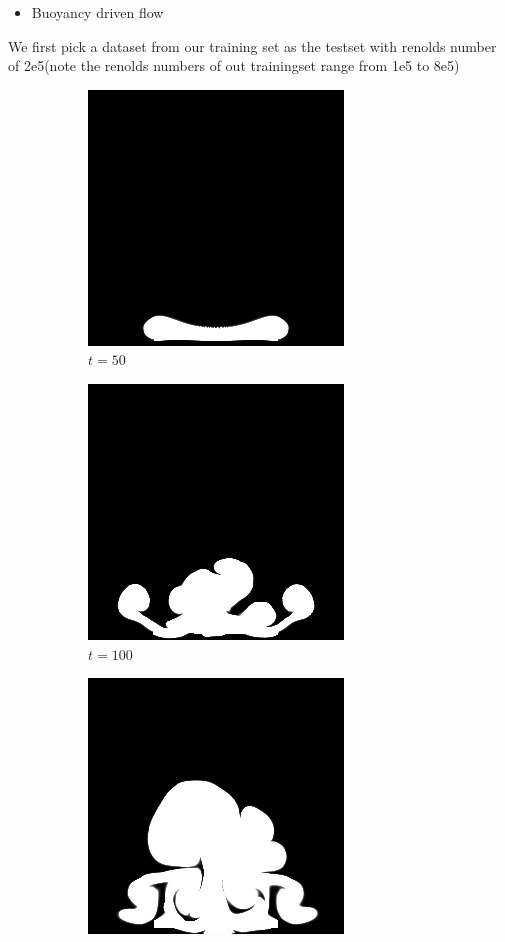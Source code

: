 \documentclass[a4paper,12pt,twoside]{report}
\begin{document}
\begin{itemize}
  \item Buoyancy driven flow
\end{itemize}
We first pick a dataset from our training set as the testset with renolds number of 2e5(note the renolds numbers of out trainingset range from 1e5 to 8e5)
\begin{figure}
\centering
\begin{subfigure}{0.18\textwidth}
  \centering
  \includegraphics[scale=0.28]{buoyancy/dens_000050_ref.png}
  \caption{$t=50$}
\end{subfigure}
\begin{subfigure}{0.18\textwidth}
  \centering
  \includegraphics[scale=0.28]{buoyancy/dens_000100_ref.png}
  \caption{$t=100$}
\end{subfigure}
\begin{subfigure}{0.18\textwidth}
  \centering
  \includegraphics[scale=0.28]{buoyancy/dens_000150_ref.png}

\end{subfigure}
\end{figure}
\end{document}
